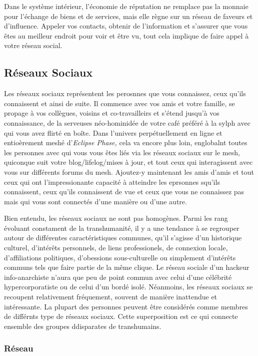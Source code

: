 Dans le système intérieur, l'économie de réputation ne remplace pas la monnaie pour l'échange de biens et de services, mais elle règne sur un réseau de faveurs et d'influence. Appeler vos contacts, obtenir de l'information et s'assurer que vous êtes au meilleur endroit pour voir et être vu, tout cela implique de faire appel à votre réseau social. 

\subsection{Réseaux Sociaux} 

Les réseaux sociaux représentent les perosnnes que vous connaissez, ceux qu'ils connaissent et ainsi de suite. Il commence avec vos amis et votre famille, se propage à vos collègues, voisins et co-travailleirs et s'étend jusqu'à vos connaissance, de la serveuses néo-hominidée de votre café préféré à la sylph avec qui vous avez flirté en boîte. Dans l'univers perpétuellement en ligne et entioèrement meshé d'\textit{Eclipse Phase,} cela va encore plus loin, englobalnt toutes les personnes avec qui vous vous êtes liés via les réseaux sociaux sur le mesh, quiconque suit votre blog/lifelog/mises à jour, et tout ceux qui interagissent avec vous sur différents forums du mesh. Ajoutez-y maintenant les amis d'amis et tout ceux qui ont l'impressionante capacité à atteindre les eprsonnes squ'ils connaissent, ceux qu'ils connaissent de vue et ceux que vous ne connaissez pas mais qui vous sont connectés d'une manière ou d'une autre. 

Bien entendu, les réseaux sociaux ne sont pas homogènes. Parmi les rang évoluant constament de la transhumanité, il y a une tendance à se regrouper autour de différentes caractéristiques communes, qu'il s'agisse d'un historique culturel, d'intérêts personnels, de liens professionels, de connexion locale, d'affiliations politiques, d'obessions sous-culturelle ou simplement d'intérêts communs tels que faire partie de la même clique. Le réseau sociale d'un hackeur info-anarchiste n'aura que peu de point commun avec celui d'une célébrité hypercorporatiste ou de celui d'un bordé isolé. Néanmoins, les réseaux sociaux se recoupent relativement fréquement, souvent de manière inattendue et intéressante. La plupart des personnes peuvent être considérés comme membres de différnts type de réseaux sociaux. Cette superposition est ce qui connecte ensemble des groupes ddisparates de transhumains. 

\subsubsection{Réseau} 

